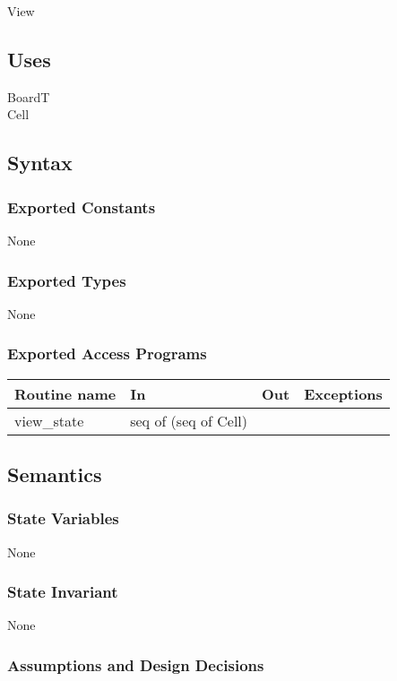 \documentclass[12pt]{article}
\begin{document}
View

\subsection* {Uses}

BoardT\\
Cell

\subsection* {Syntax}

\subsubsection* {Exported Constants}

None

\subsubsection* {Exported Types}

None

\subsubsection* {Exported Access Programs}

\begin{tabular}{| l | l | l | p{5cm} |}
\hline
\textbf{Routine name} & \textbf{In} & \textbf{Out} & \textbf{Exceptions}\\
\hline
view\_state & seq of (seq of Cell) & &\\
\hline
\end{tabular}

\subsection* {Semantics}

\subsubsection* {State Variables}

None

\subsubsection* {State Invariant}

None

\subsubsection* {Assumptions and Design Decisions}
\end{document}
